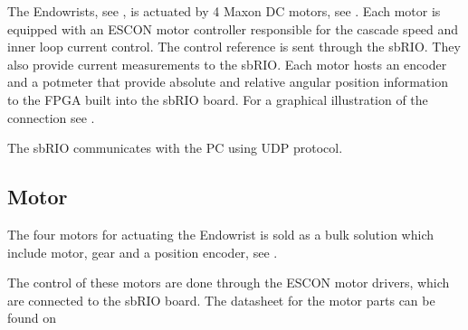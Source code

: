 The Endowrists, see , is actuated by 4 Maxon DC motors, see . Each motor is equipped with an ESCON motor controller responsible for the cascade speed and inner loop current control. The control reference is sent through the sbRIO. They also provide current measurements to the sbRIO. Each motor hosts an encoder and a potmeter that provide absolute and relative angular position information to the FPGA built into the sbRIO board. For a graphical illustration of the connection see .
 
The sbRIO communicates with the PC using UDP protocol. 




\subsection{Motor}\label{Maxon_Motor}
The four motors for actuating the Endowrist is sold as a bulk solution which include motor, gear and a position encoder, see .

The control of these motors are done through the ESCON motor drivers, which are connected to the sbRIO board. The datasheet for the motor parts can be found on 


